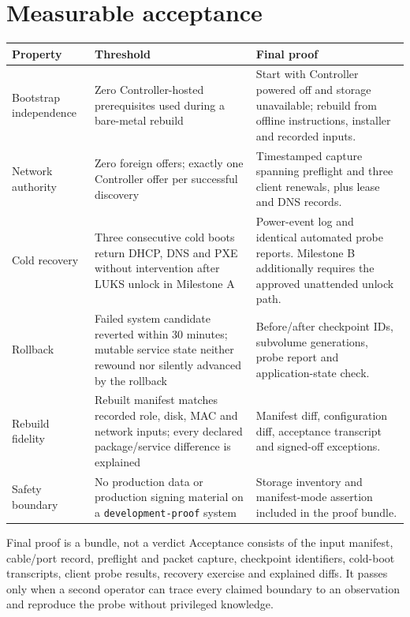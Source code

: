 \section{Measurable acceptance}
\begin{longtable}{@{}p{.22\linewidth}p{.31\linewidth}p{.41\linewidth}@{}}
\toprule
\textbf{Property} & \textbf{Threshold} & \textbf{Final proof}\\
\midrule
Bootstrap independence & Zero Controller-hosted prerequisites used during a bare-metal rebuild & Start with Controller powered off and storage unavailable; rebuild from offline instructions, installer and recorded inputs.\\
Network authority & Zero foreign offers; exactly one Controller offer per successful discovery & Timestamped capture spanning preflight and three client renewals, plus lease and DNS records.\\
Cold recovery & Three consecutive cold boots return DHCP, DNS and PXE without intervention after LUKS unlock in Milestone A & Power-event log and identical automated probe reports. Milestone B additionally requires the approved unattended unlock path.\\
Rollback & Failed system candidate reverted within 30 minutes; mutable service state neither rewound nor silently advanced by the rollback & Before/after checkpoint IDs, subvolume generations, probe report and application-state check.\\
Rebuild fidelity & Rebuilt manifest matches recorded role, disk, MAC and network inputs; every declared package/service difference is explained & Manifest diff, configuration diff, acceptance transcript and signed-off exceptions.\\
Safety boundary & No production data or production signing material on a \texttt{development-proof} system & Storage inventory and manifest-mode assertion included in the proof bundle.\\
\bottomrule
\end{longtable}

\begin{gate}{Final proof is a bundle, not a verdict}
Acceptance consists of the input manifest, cable/port record, preflight and
packet capture, checkpoint identifiers, cold-boot transcripts, client probe
results, recovery exercise and explained diffs. It passes only when a second
operator can trace every claimed boundary to an observation and reproduce the
probe without privileged knowledge.
\end{gate}

